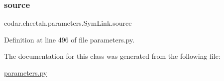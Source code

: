 \subsubsection{\texorpdfstring{source}{source}}
{\footnotesize\ttfamily codar.\+cheetah.\+parameters.\+Sym\+Link.\+source}



Definition at line 496 of file parameters.\+py.



The documentation for this class was generated from the following file\+:\begin{DoxyCompactItemize}
\item 
\hyperlink{parameters_8py}{parameters.\+py}\end{DoxyCompactItemize}
